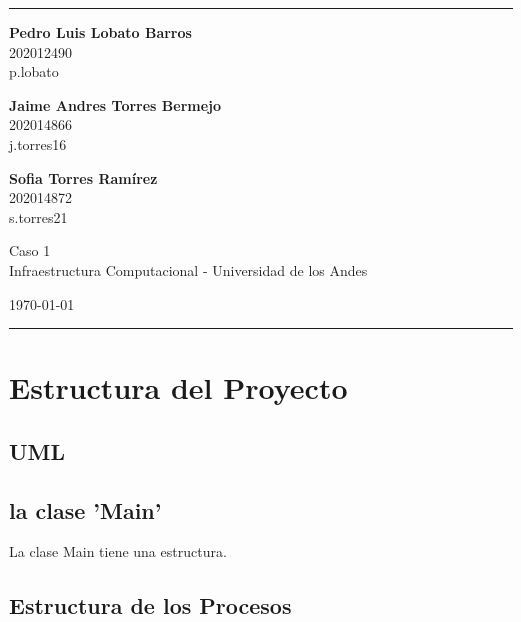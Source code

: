 \documentclass[a4paper]{article}
\begin{document}

\fancyhead[C]{}
\hrule \medskip %
\begin{minipage}{0.295\textwidth} 
\raggedright
\footnotesize
\textbf{Pedro Luis Lobato Barros} \hfill\\    
202012490\hfill\\
p.lobato

\textbf{Jaime Andres Torres Bermejo} \hfill\\   
202014866\hfill\\
j.torres16

\textbf{Sofia Torres Ramírez} \hfill\\   
202014872\hfill\\
s.torres21

\end{minipage}
\begin{minipage}{0.4\textwidth} 
\centering 
\large 
Caso 1\\ 
\normalsize 
Infraestructura Computacional - Universidad de los Andes\\ 
\end{minipage}
\begin{minipage}{0.295\textwidth} 
\raggedleft
\today\hfill\\
\end{minipage}
\medskip\hrule 
\bigskip


\section{Estructura del Proyecto}
    
    \subsection{UML}
    
    \subsection{la clase 'Main'}

    La clase Main tiene una estructura.

    \subsection{Estructura de los Procesos}
    
\end{document}
